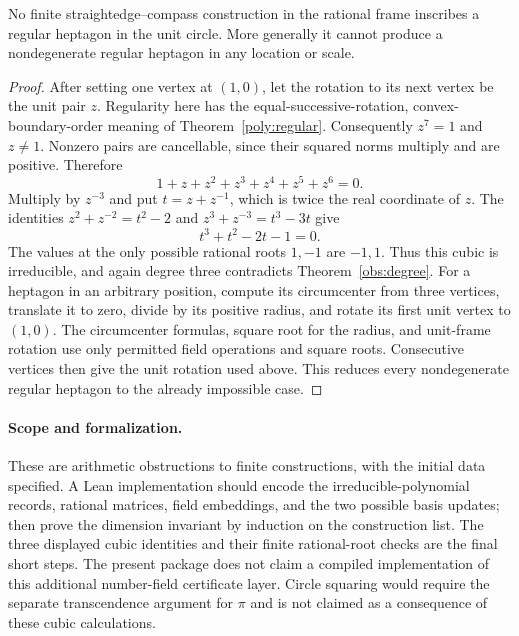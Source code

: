 \begin{theorem}
\label{obs:heptagon}
No finite straightedge--compass construction in the rational frame
inscribes a regular heptagon in the unit circle.  More generally it cannot
produce a nondegenerate regular heptagon in any location or scale.
\end{theorem}
\begin{proof}
After setting one vertex at $(1,0)$, let the rotation to its next vertex
be the unit pair $z$.  Regularity here has the equal-successive-rotation,
convex-boundary-order meaning of Theorem~\ref{poly:regular}.  Consequently
$z^7=1$ and $z\ne1$.
Nonzero pairs are cancellable, since their squared norms multiply and
are positive.  Therefore
\[
 1+z+z^2+z^3+z^4+z^5+z^6=0.
\]
Multiply by $z^{-3}$ and put $t=z+z^{-1}$, which is twice the real
coordinate of $z$.  The identities
$z^2+z^{-2}=t^2-2$ and $z^3+z^{-3}=t^3-3t$ give
\[
 t^3+t^2-2t-1=0.
\]
The values at the only possible rational roots $1,-1$ are $-1,1$.
Thus this cubic is irreducible, and again degree three contradicts
Theorem~\ref{obs:degree}.
For a heptagon in an arbitrary position, compute its circumcenter from
three vertices, translate it to zero, divide by its positive radius, and
rotate its first unit vertex to $(1,0)$.  The circumcenter formulas,
square root for the radius, and unit-frame rotation use only permitted
field operations and square roots.  Consecutive vertices then give the
unit rotation used above.  This reduces every nondegenerate regular
heptagon to the already impossible case.
\end{proof}

\paragraph{Scope and formalization.}
These are arithmetic obstructions to finite constructions, with the
initial data specified.  A Lean implementation should encode the
irreducible-polynomial records, rational matrices, field embeddings,
and the two possible basis updates; then prove the dimension invariant
by induction on the construction list.  The three displayed cubic
identities and their finite rational-root checks are the final short
steps.  The present package does not claim a compiled implementation of
this additional number-field certificate layer.  Circle squaring would
require the separate transcendence argument for $\pi$ and is not claimed
as a consequence of these cubic calculations.
